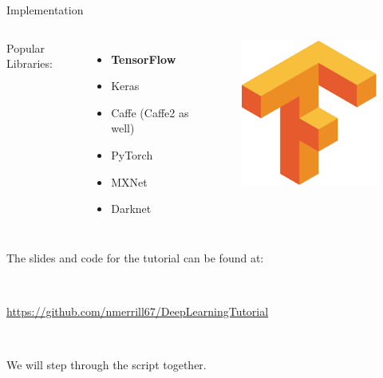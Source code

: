 \documentclass{beamer}
\begin{document}
\begin{frame}{Implementation}
    \vspace{-20pt}  
    \begin{columns}
	Popular Libraries:
	\begin{itemize}
		\item {\bf TensorFlow}
		\item Keras
		\item Caffe (Caffe2 as well)
		\item PyTorch
		\item MXNet
		\item Darknet
	\end{itemize}
	\vspace{-50pt}
	\begin{figure}
		\includegraphics[width=.5\columnwidth]{tf}
	\end{figure}
    \end{columns}    
    
    \vspace{30pt}

    The slides and code for the tutorial can be found at: 


    \

    \url{https://github.com/nmerrill67/DeepLearningTutorial}

    \

    We will step through the script together.
    
\end{frame}
\end{document}
